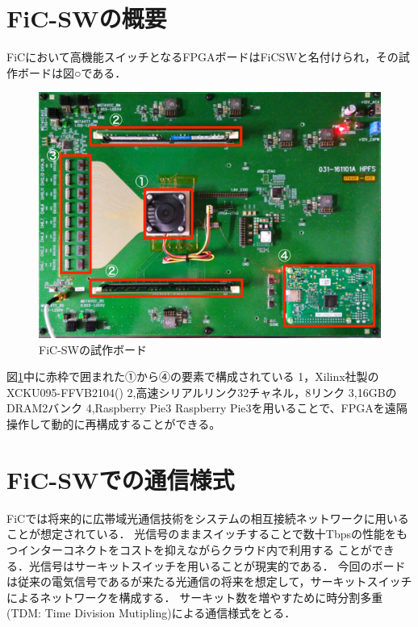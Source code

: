 {\section{FiC-SWの概要}
\label{sec:about_ficsw}
FiCにおいて高機能スイッチとなるFPGAボードはFiCSWと名付けられ，その試作ボードは図○である．
\begin{figure}[h]
  \centering
  \includegraphics[width=12cm]{./chap3/fig/ficsw.pdf}
  \caption{FiC-SWの試作ボード}
  \label{fig:ficsw}
\end{figure}
図\ref{fig:ficsw}中に赤枠で囲まれた①から④の要素で構成されている
1，Xilinx社製のXCKU095-FFVB2104()
2,高速シリアルリンク32チャネル，8リンク
3,16GBのDRAM2バンク
4,Raspberry Pie3
Raspberry Pie3を用いることで、FPGAを遠隔操作して動的に再構成することができる。
\section{FiC-SWでの通信様式}
\label{sec:ficsw_communication}
FiCでは将来的に広帯域光通信技術をシステムの相互接続ネットワークに用いることが想定されている．
光信号のままスイッチすることで数十Tbpsの性能をもつインターコネクトをコストを抑えながらクラウド内で利用する
ことができる．光信号はサーキットスイッチを用いることが現実的である．
今回のボードは従来の電気信号であるが来たる光通信の将来を想定して，サーキットスイッチによるネットワークを構成する．
サーキット数を増やすために時分割多重(TDM: Time Division Mutipling)による通信様式をとる．


}
